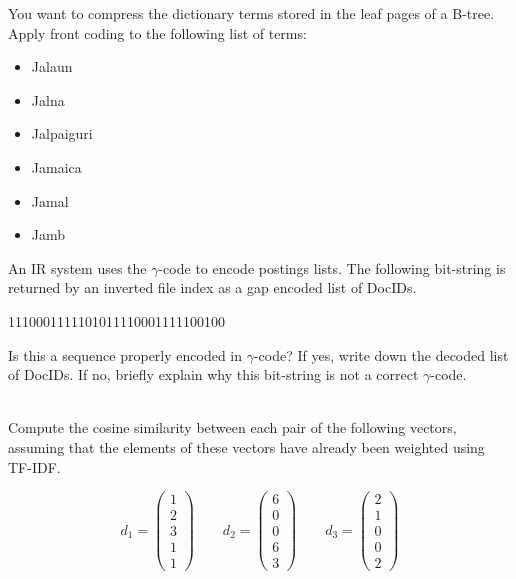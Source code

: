 \documentclass[12pt]{article}
\newcommand{\question}[1]{\item{#1}}
\newcommand{\answer}[1]{\fbox{\parbox{\linewidth}{#1}}}
\begin{document}
{{			\answer{}
		}

		\question{
			You want to compress the dictionary terms stored in the leaf pages of a B-tree. Apply front coding to the following list of terms:
			\begin{itemize}
				\item{Jalaun}
				\item{Jalna}
				\item{Jalpaiguri}
				\item{Jamaica}
				\item{Jamal}
				\item{Jamb}
			\end{itemize}
			
			\answer{}
		}

		\newpage
		\question{
			An IR system uses the $\gamma$-code to encode postings lists. The following bit-string is returned by an inverted file index as a gap encoded list of DocIDs.
			\begin{center}
				1110001111101011110001111100100
			\end{center}
			Is this a sequence properly encoded in $\gamma$-code? If yes, write down the decoded list of DocIDs. If no, briefly explain why this bit-string is not a correct $\gamma$-code.\\ \\
			
			\answer{}
		}
		
		\question{
			Compute the cosine similarity between each pair of the following vectors, assuming that the elements of these vectors have already been weighted using TF-IDF.
		
			\[ d_{1} = \left(\begin{array}{c}
				1 \\ 2 \\ 3 \\ 1 \\ 1
			 \end{array} \right) 	
			 \qquad		 
			 d_{2} = \left(\begin{array}{c}
				6 \\ 0 \\ 0 \\ 6 \\ 3
			 \end{array} \right)	
			 \qquad		 
			 d_{3} = \left(\begin{array}{c}
				2 \\ 1 \\ 0 \\ 0 \\ 2
			 \end{array} \right)\] 
			 
			\answer{}
		}
	}
\end{document}
